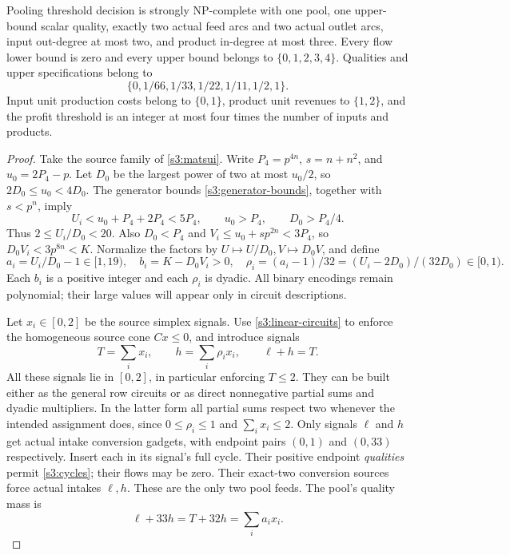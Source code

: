 \begin{theorem}\label{s3:constant-thm}
Pooling threshold decision is strongly NP-complete with one pool, one
upper-bound scalar quality, exactly two actual feed arcs and two actual
outlet arcs, input out-degree at most two, and product in-degree at most
three. Every flow lower bound is zero and every upper bound belongs to
$\{0,1,2,3,4\}$. Qualities and upper specifications belong to
\begin{equation}
 \{0,1/66,1/33,1/22,1/11,1/2,1\}.\label{s3:palette}
\end{equation}
Input unit production costs belong to $\{0,1\}$, product unit revenues
to $\{1,2\}$, and the profit threshold is an integer at most four times
the number of inputs and products.
\end{theorem}
\begin{proof}
Take the source family of \cref{s3:matsui}. Write $P_4=p^{4n}$,
$s=n+n^2$, and $u_0=2P_4-p$. Let $D_0$ be the largest power of two
at most $u_0/2$, so $2D_0\le u_0<4D_0$. The generator bounds
\eqref{s3:generator-bounds}, together with $s<p^n$, imply
\[
 U_i<u_0+P_4+2P_4<5P_4,\qquad
 u_0>P_4,\qquad D_0>P_4/4.
\]
Thus $2\le U_i/D_0<20$. Also $D_0<P_4$ and
$V_i\le u_0+sp^{2n}<3P_4$, so $D_0V_i<3p^{8n}<K$.
Normalize the factors by $U\mapsto U/D_0,V\mapsto D_0V$, and define
\begin{equation}
 a_i=U_i/D_0-1\in[1,19),\quad b_i=K-D_0V_i>0,
 \quad \rho_i=(a_i-1)/32=(U_i-2D_0)/(32D_0)\in[0,1).
 \label{s3:dyadic-data}
\end{equation}
Each $b_i$ is a positive integer and each $\rho_i$ is dyadic. All
binary encodings remain polynomial; their large values will appear
only in circuit descriptions.

Let $x_i\in[0,2]$ be the source simplex signals. Use
\cref{s3:linear-circuits} to enforce the homogeneous source cone
$Cx\le0$, and introduce signals
\begin{equation}
 T=\sum_i x_i,\qquad h=\sum_i\rho_ix_i,\qquad \ell+h=T.
 \label{s3:two-feeds}
\end{equation}
All these signals lie in $[0,2]$, in particular enforcing $T\le2$.
They can be built either as the general row circuits or as direct
nonnegative partial sums and dyadic multipliers. In the latter form all
partial sums respect two whenever the intended assignment does, since
$0\le\rho_i\le1$ and $\sum_i x_i\le2$.
Only signals $\ell$ and $h$ get actual intake conversion gadgets, with
endpoint pairs $(0,1)$ and $(0,33)$ respectively. Insert each in its
signal's full cycle. Their positive endpoint \emph{qualities} permit
\cref{s3:cycles}; their flows may be zero. Their exact-two conversion
sources force actual intakes $\ell,h$. These are the only two pool feeds.
The pool's quality mass is
\begin{equation}
 \ell+33h=T+32h=\sum_i a_ix_i.\label{s3:mass-two-feeds}
\end{equation}


\end{proof}
